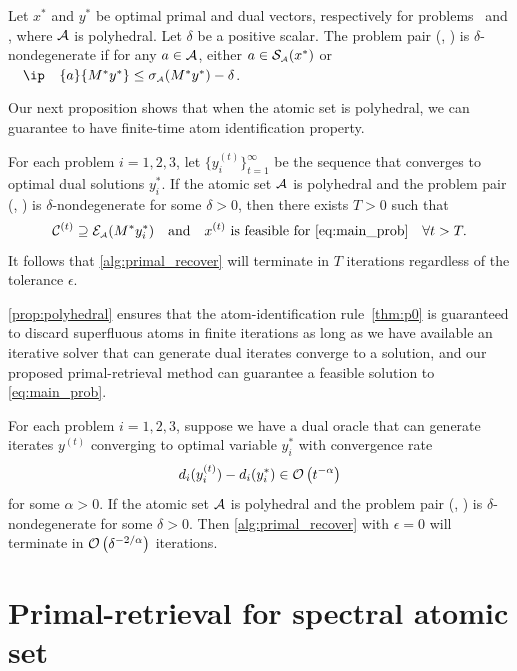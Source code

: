 \begin{definition}
    Let $x^*$ and $y^*$ be optimal primal and dual vectors, respectively for
    problems \Probi\ and \Drobi, where $\mathcal{A}$ is polyhedral. Let $\delta$ be a positive scalar. 
    The problem pair (\Probi, \Drobi) is $\delta$-nondegenerate if for any $a\in\mathcal{A}$, either $a\in\operatorname{\mathcal{S}_{\scriptscriptstyle\mathcal{A}}}(x^*)$ or $\ip{a}{M^*y^*} \leq \sigma\As(M^*y^*) - \delta$. 
\end{definition}

Our next proposition shows that when the atomic set is polyhedral, we can guarantee to have finite-time atom identification property. 

\begin{proposition} \label{prop:polyhedral} For each problem $i
    = 1, 2, 3$, let $\{y_i^{(t)}\}_{t=1}^\infty$
    be the sequence that converges to optimal dual solutions $
    y_i^*$. If the atomic set $\mathcal{A}$ is polyhedral and the problem pair (\Probi, \Drobi) is $\delta$-nondegenerate for some $\delta > 0$,
    then there exists
    $T > 0$ such that 
    \[\mathcal{C}^{(t)} \supseteq \mathcal{E}_{\scriptscriptstyle\mathcal{A}}( M^* y_i^*) 
    \hbox{\quad and\quad}
    x^{(t)} \mbox{ is feasible for } \eqref{eq:main_prob} 
    \quad \forall t>T.\]
    It follows that \autoref{alg:primal_recover} will terminate in $T$ iterations regardless of the tolerance $\epsilon$. 
\end{proposition}

\autoref{prop:polyhedral} ensures that the atom-identification rule~\autoref{thm:p0} is guaranteed to discard superfluous atoms in finite iterations as long as we have available an iterative solver that can generate dual iterates converge to a solution, and  our proposed primal-retrieval method can guarantee a feasible solution to \eqref{eq:main_prob}. 

\begin{corollary} \label{coro:polyhedral}
    For each problem $i= 1, 2, 3$, suppose we have a dual oracle that can generate iterates $y^{(t)}$ converging to optimal variable $y_i^*$ with convergence rate
    \[d_i(y_i^{(t)}) - d_i(y_i^*) \in \mathcal{O}\left( t^{-\alpha} \right)\]
    for some $\alpha > 0$. If the atomic set $\mathcal{A}$ is polyhedral and the problem pair (\Probi, \Drobi) is $\delta$-nondegenerate for some $\delta > 0$. Then \autoref{alg:primal_recover} with $\epsilon=0$ will terminate in $\mathcal{O}\left(\delta^{-2/\alpha}\right)$ iterations. 
\end{corollary}

\section{Primal-retrieval for spectral atomic set} \label{sec:spectral}

